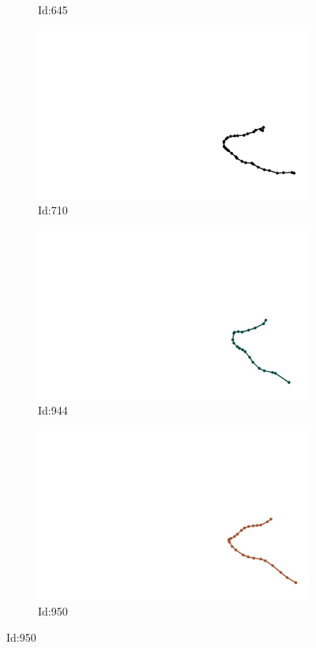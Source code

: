 \documentclass[12pt,twoside]{report}
\begin{document}
\begin{figure}
\begin{subfigure}[b]{0.20\textwidth}
\caption{Id:645}
\end{subfigure}
\begin{subfigure}[b]{0.20\textwidth}
\centering
\includegraphics[width=\textwidth]{../../trajectories/710.png}
\caption{Id:710}
\end{subfigure}
\begin{subfigure}[b]{0.20\textwidth}
\centering
\includegraphics[width=\textwidth]{../../trajectories/944.png}
\caption{Id:944}
\end{subfigure}
\begin{subfigure}[b]{0.20\textwidth}
\centering
\includegraphics[width=\textwidth]{../../trajectories/950.png}
\caption{Id:950}
\end{subfigure}
\end{figure}
\end{document}
